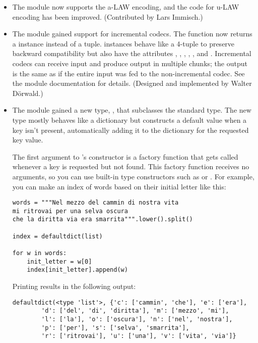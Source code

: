 \documentclass{howto}
\begin{document}
\begin{itemize}

\item The  module now supports the a-LAW encoding,
and the code for u-LAW encoding has been improved.  (Contributed by
Lars Immisch.)

\item The  module gained support for incremental
codecs.  The  function now
returns a  instance instead of a tuple.
 instances behave like a 4-tuple to preserve backward
compatibility but also have the attributes ,
, , ,
, and .  Incremental codecs 
can receive input and produce output in multiple chunks; the output is
the same as if the entire input was fed to the non-incremental codec.
See the  module documentation for details.
(Designed and implemented by Walter D\"orwald.)

\item The  module gained a new type,
, that subclasses the standard 
type.  The new type mostly behaves like a dictionary but constructs a
default value when a key isn't present, automatically adding it to the
dictionary for the requested key value.

The first argument to 's constructor is a factory
function that gets called whenever a key is requested but not found.
This factory function receives no arguments, so you can use built-in
type constructors such as  or .  For
example, 
you can make an index of words based on their initial letter like this:

\begin{verbatim}
words = """Nel mezzo del cammin di nostra vita
mi ritrovai per una selva oscura
che la diritta via era smarrita""".lower().split()

index = defaultdict(list)

for w in words:
    init_letter = w[0]
    index[init_letter].append(w)
\end{verbatim}

Printing  results in the following output:

\begin{verbatim}
defaultdict(<type 'list'>, {'c': ['cammin', 'che'], 'e': ['era'], 
        'd': ['del', 'di', 'diritta'], 'm': ['mezzo', 'mi'], 
        'l': ['la'], 'o': ['oscura'], 'n': ['nel', 'nostra'], 
        'p': ['per'], 's': ['selva', 'smarrita'], 
        'r': ['ritrovai'], 'u': ['una'], 'v': ['vita', 'via']}
\end{verbatim}


\end{itemize}
\end{document}

